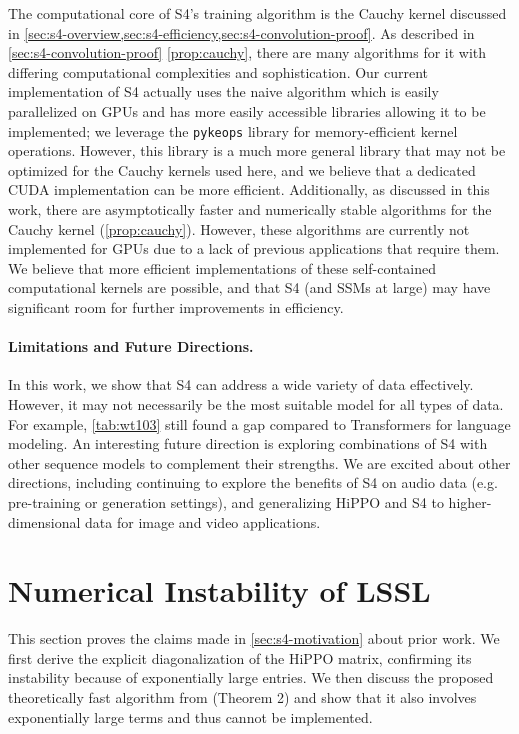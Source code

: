 \documentclass{article}
\newcommand{\methodabbrv}{S4}
\begin{document}
The computational core of \methodabbrv's training algorithm is the Cauchy kernel discussed in \cref{sec:s4-overview,sec:s4-efficiency,sec:s4-convolution-proof}.
As described in \cref{sec:s4-convolution-proof} \cref{prop:cauchy},
there are many algorithms for it with differing computational complexities and sophistication.
Our current implementation of \methodabbrv{} actually uses the naive  algorithm
which is easily parallelized on GPUs and has more easily accessible libraries allowing it to be implemented;
we leverage the \texttt{pykeops} library for memory-efficient kernel operations.
However, this library is a much more general library that may not be optimized for the Cauchy kernels used here,
and we believe that a dedicated CUDA implementation can be more efficient.
Additionally, as discussed in this work, there are asymptotically faster and numerically stable algorithms for the Cauchy kernel (\cref{prop:cauchy}).
However, these algorithms are currently not implemented for GPUs due to a lack of previous applications that require them.
We believe that more efficient implementations of these self-contained computational kernels are possible,
and that \methodabbrv{} (and SSMs at large) may have significant room for further improvements in efficiency.


\paragraph{Limitations and Future Directions.}
In this work, we show that \methodabbrv{} can address a wide variety of data effectively.
However, it may not necessarily be the most suitable model for all types of data.
For example, \cref{tab:wt103} still found a gap compared to Transformers for language modeling.
An interesting future direction is exploring combinations of S4 with other sequence models to complement their strengths.
We are excited about other directions, including continuing to explore the benefits of S4 on audio data (e.g. pre-training or generation settings),
and generalizing HiPPO and S4 to higher-dimensional data for image and video applications.
 \section{Numerical Instability of LSSL}
\label{sec:lssl-instability}


This section proves the claims made in \cref{sec:s4-motivation} about prior work.
We first derive the explicit diagonalization of the HiPPO matrix, confirming its instability because of exponentially large entries.
We then discuss the proposed theoretically fast algorithm from \citep{gu2021lssl} (Theorem 2) and show that it also involves exponentially large terms and thus cannot be implemented.
\end{document}
